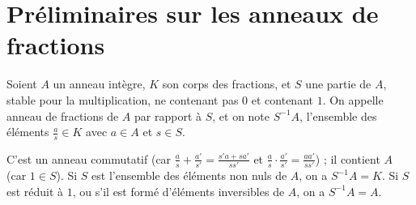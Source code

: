 \documentclass[11pt, %
  title in boldface,
  theorem in new line,
  theorem numbering = section,
  number theorems separately,
  simple name,
]{beaulivre}
\begin{document}
\enlargethispage*{\baselineskip}
\section{Préliminaires sur les anneaux de fractions}\label{sec:préliminaires sur les anneaux de fractions}

    \begin{definition}
        Soient \( A \) un anneau intègre, \( K \) son corps des fractions, et \( S \) une partie de \( A \), stable pour la multiplication, ne contenant pas \( 0 \) et contenant \( 1 \). On appelle anneau de fractions de \( A \) par rapport à \( S \), et on note \( S^{-1} A \), l'ensemble des éléments \( \frac{a}{s} \in K \) avec \( a \in A \) et \( s \in S \).
    \end{definition}

    C'est un anneau commutatif (car \( \frac{a}{s} + \frac{a'}{s'} = \frac{s'a+sa'}{ss'} \) et \( \frac{a}{s} \cdot \frac{a'}{s'} = \frac{aa'}{ss'} \)) ; il contient \( A \) (car \( 1 \in S \)). Si \( S \) est l'ensemble des éléments non nuls de \( A \), on a \( S^{-1} A = K \). Si \( S \) est réduit à \( 1 \), ou s'il est formé d'éléments inversibles de \( A \), on a \( S^{-1} A = A \).
\end{document}
